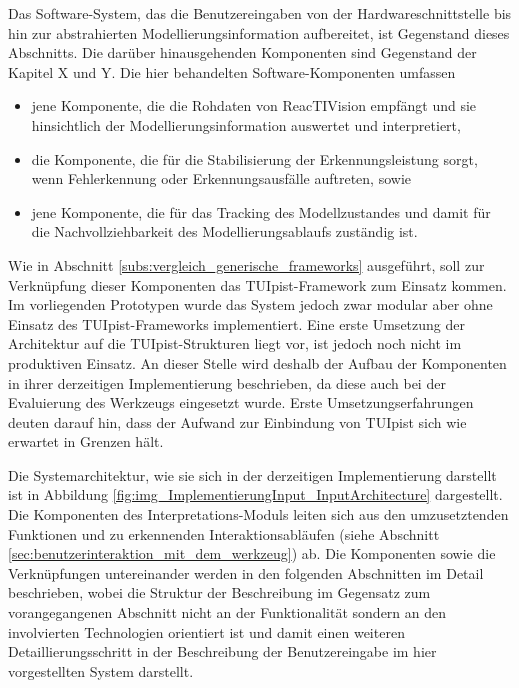 Das Software-System, das die Benutzereingaben von der Hardwareschnittstelle bis hin zur abstrahierten Modellierungsinformation aufbereitet, ist Gegenstand dieses Abschnitts. Die darüber hinausgehenden Komponenten sind Gegenstand der Kapitel X und Y. Die hier behandelten Software-Komponenten umfassen
\begin{itemize}
	\item jene Komponente, die die Rohdaten von ReacTIVision empfängt und sie hinsichtlich der Modellierungsinformation auswertet und interpretiert,
	\item die Komponente, die für die Stabilisierung der Erkennungsleistung sorgt, wenn Fehlerkennung oder Erkennungsausfälle auftreten, sowie
	\item jene Komponente, die für das Tracking des Modellzustandes und damit für die Nachvollziehbarkeit des Modellierungsablaufs zuständig ist. 
\end{itemize}
Wie in Abschnitt \ref{subs:vergleich_generische_frameworks} ausgeführt, soll zur Verknüpfung dieser Komponenten das TUIpist-Framework zum Einsatz kommen. Im vorliegenden Prototypen wurde das System jedoch zwar modular aber ohne Einsatz des TUIpist-Frameworks implementiert. Eine erste Umsetzung der Architektur auf die TUIpist-Strukturen liegt vor, ist jedoch noch nicht im produktiven Einsatz. An dieser Stelle wird deshalb der Aufbau der Komponenten in ihrer derzeitigen Implementierung beschrieben, da diese auch bei der Evaluierung des Werkzeugs eingesetzt wurde. Erste Umsetzungserfahrungen deuten darauf hin, dass der Aufwand zur Einbindung von TUIpist sich wie erwartet in Grenzen hält.

Die Systemarchitektur, wie sie sich in der derzeitigen Implementierung darstellt ist in Abbildung \ref{fig:img_ImplementierungInput_InputArchitecture} dargestellt. Die Komponenten des Interpretations-Moduls leiten sich aus den umzusetztenden Funktionen und zu erkennenden Interaktionsabläufen (siehe Abschnitt \ref{sec:benutzerinteraktion_mit_dem_werkzeug}) ab. Die Komponenten sowie die Verknüpfungen untereinander werden in den folgenden Abschnitten im Detail beschrieben, wobei die Struktur der Beschreibung im Gegensatz zum vorangegangenen Abschnitt nicht an der Funktionalität sondern an den involvierten Technologien orientiert ist und damit einen weiteren Detaillierungsschritt in der Beschreibung der Benutzereingabe im hier vorgestellten System darstellt.

